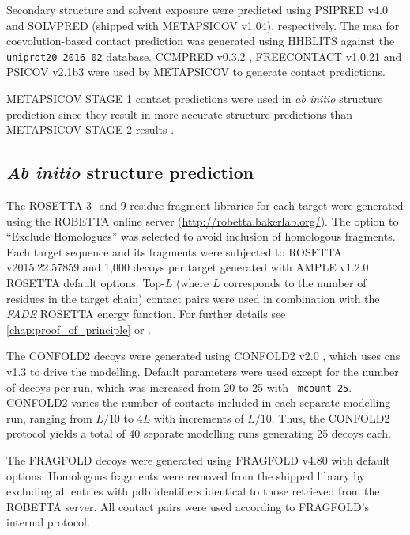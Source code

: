 Secondary structure and solvent exposure were predicted using PSIPRED v4.0 \cite{Jones1999-ed} and SOLVPRED (shipped with METAPSICOV v1.04), respectively. The \gls{msa} for coevolution-based contact prediction was generated using HHBLITS \cite{Remmert2011-kt} against the \texttt{uniprot20\_2016\_02} database. CCMPRED v0.3.2 \cite{Seemayer2014-zp}, FREECONTACT v1.0.21 \cite{Kajan2014-bx} and PSICOV v2.1b3 \cite{Jones2012-ks} were used by METAPSICOV to generate contact predictions.

METAPSICOV STAGE 1 contact predictions were used in \textit{ab initio} structure prediction since they result in more accurate structure predictions than METAPSICOV STAGE 2 results \cite{Jones2015-vq}.

\subsection{\textit{Ab initio} structure prediction} \label{sec:ample_saint2_modelling}
The ROSETTA 3- and 9-residue fragment libraries for each target were generated using the ROBETTA online server (\url{http://robetta.bakerlab.org/}). The option to ``Exclude Homologues'' was selected to avoid inclusion of homologous fragments. Each target sequence and its fragments were subjected to ROSETTA v2015.22.57859 \cite{Rohl2004-dj} and 1,000 decoys per target generated with AMPLE v1.2.0 ROSETTA default options. Top-$L$ (where $L$ corresponds to the number of residues in the target chain) contact pairs were used in combination with the \textit{FADE} ROSETTA energy function. For further details see \cref{chap:proof_of_principle} or \textcite{Michel2014-eg}.

The CONFOLD2 decoys were generated using CONFOLD2 v2.0 \cite{Adhikari2018-lj}, which uses \gls{cns} v1.3 \cite{Brunger1998-sz} to drive the modelling. Default parameters were used except for the number of decoys per run, which was increased from 20 to 25 with \texttt{-mcount 25}. CONFOLD2 varies the number of contacts included in each separate modelling run, ranging from $L/10$ to $4L$ with increments of $L/10$. Thus, the CONFOLD2 protocol yields a total of 40 separate modelling runs generating 25 decoys each.

The FRAGFOLD decoys were generated using FRAGFOLD v4.80 \cite{Jones2001-mc} with default options. Homologous fragments were removed from the shipped library  by excluding all entries with \gls{pdb} identifiers identical to those retrieved from the ROBETTA server. All contact pairs were used according to FRAGFOLD's internal protocol.

